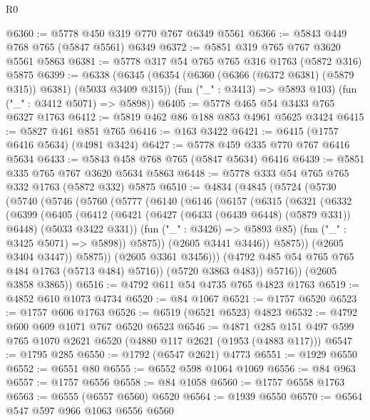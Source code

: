 \begin{lexlean}{R0}
\begin{coremodule}
{{{{{@6360 := @5778 @450 @319 @770 @767 @6349 @5561
@6366 := @5843 @449 @768 @765 (@5847 @5561) @6349
@6372 := @5851 @319 @765 @767 @3620 @5561 @5863
@6381 := @5778 @317 @54 @765 @765 @316 @1763 (@5872 @316) @5875
@6399 := @6338
    (@6345
      (@6354 (@6360 (@6366 (@6372 @6381) (@5879 @315)) @6381) (@5033 @3409 @315))
      (fun ("_" : @3413) => @5893 @103)
      (fun ("_" : @3412 @5071) => @5898))
@6405 := @5778 @465 @54 @3433 @765 @6327 @1763
@6412 := @5819 @462 @86 @188 @853 @4961 @5625 @3424
@6415 := @5827 @461 @851 @765
@6416 := @163 @3422
@6421 := @6415 (@1757 @6416 @5634) (@4981 @3424)
@6427 := @5778 @459 @335 @770 @767 @6416 @5634
@6433 := @5843 @458 @768 @765 (@5847 @5634) @6416
@6439 := @5851 @335 @765 @767 @3620 @5634 @5863
@6448 := @5778 @333 @54 @765 @765 @332 @1763 (@5872 @332) @5875
@6510 := @4834
    (@4845
      (@5724
        (@5730
          (@5740
            (@5746
              (@5760
                (@5777
                  (@6140
                    (@6146
                      (@6157
                        (@6315
                          (@6321
                            (@6332
                              (@6399
                                (@6405
                                  (@6412
                                    (@6421
                                      (@6427 (@6433 (@6439 @6448) (@5879 @331)) @6448)
                                      (@5033 @3422 @331))
                                    (fun ("_" : @3426) => @5893 @85)
                                    (fun ("_" : @3425 @5071) => @5898))
                                  @5875))
                              (@2605 @3441 @3446))
                            @5875))
                        (@2605 @3404 @3447))
                      @5875))
                  (@2605 @3361 @3456)))
              (@4792 @485 @54 @765 @765 @484 @1763 (@5713 @484) @5716))
            (@5720 @3863 @483))
          @5716))
      (@2605 @3858 @3865))
@6516 := @4792 @611 @54 @4735 @765 @4823 @1763
@6519 := @4852 @610 @1073 @4734
@6520 := @84 @1067
@6521 := @1757 @6520
@6523 := @1757 @606 @1763
@6526 := @6519 (@6521 @6523) @4823
@6532 := @4792 @600 @609 @1071 @767 @6520 @6523
@6546 := @4871 @285 @151 @497 @599 @765 @1070 @2621 @6520 (@4880 @117 @2621 (@1953 (@4883 @117)))
@6547 := @1795 @285
@6550 := @1792 (@6547 @2621) @4773
@6551 := @1929 @6550
@6552 := @6551 @80
@6555 := @6552 @598 @1064 @1069
@6556 := @84 @963
@6557 := @1757 @6556
@6558 := @84 @1058
@6560 := @1757 @6558 @1763
@6563 := @6555 (@6557 @6560) @6520
@6564 := @1939 @6550
@6570 := @6564 @547 @597 @966 @1063 @6556 @6560
}}}}}
\end{coremodule}
\end{lexlean}
